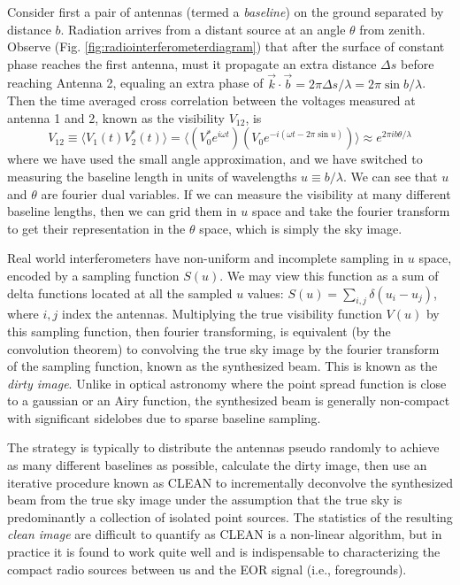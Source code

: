 Consider first a pair of antennas (termed a \textit{baseline}) on the ground separated by distance $b$. Radiation arrives from a distant source at an angle $\theta$ from zenith. Observe (Fig. \ref{fig:radiointerferometerdiagram}) that after the surface of constant phase reaches the first antenna, must it propagate an extra distance $\Delta s$ before reaching Antenna 2, equaling an extra phase of $\vec{k}\cdot \vec{b}=2\pi\Delta s/\lambda=2\pi\sin b/\lambda$. Then the time averaged cross correlation between the voltages measured at antenna 1 and 2, known as the visibility $V_{12}$, is
\begin{equation}
	V_{12}\equiv\langle V_1(t)V_2^*(t)\rangle=\langle(V_0^* e^{i\omega t})(V_0e^{-i(\omega t-2\pi\sin u)})\rangle \approx e^{2\pi i b\theta/\lambda}
\end{equation}
where we have used the small angle approximation, and we have switched to measuring the baseline length in units of wavelengths $u\equiv b/\lambda$. We can see that $u$ and $\theta$ are fourier dual variables. If we can measure the visibility at many different baseline lengths, then we can grid them in $u$ space and take the fourier transform to get their representation in the $\theta$ space, which is simply the sky image.

Real world interferometers have non-uniform and incomplete sampling in $u$ space, encoded by a sampling function $S(u)$. We may view this function as a sum of delta functions located at all the sampled $u$ values: $S(u)=\sum_{i,j}\delta(u_i-u_j)$, where $i,j$ index the antennas. Multiplying the true visibility function $V(u)$ by this sampling function, then fourier transforming, is equivalent (by the convolution theorem) to convolving the true sky image by the fourier transform of the sampling function, known as the synthesized beam. This is known as the \textit{dirty image}. Unlike in optical astronomy where the point spread function is close to a gaussian or an Airy function, the synthesized beam is generally non-compact with significant sidelobes due to sparse baseline sampling.  

The strategy is typically to distribute the antennas pseudo randomly to achieve as many different baselines as possible, calculate the dirty image, then use an iterative procedure known as CLEAN \citep{hogbomclean} to incrementally deconvolve the synthesized beam from the true sky image under the assumption that the true sky is predominantly a collection of isolated point sources. The statistics of the resulting \textit{clean image} are difficult to quantify as CLEAN is a non-linear algorithm, but in practice it is found to work quite well and is indispensable to characterizing the compact radio sources between us and the EOR signal (i.e., foregrounds).

